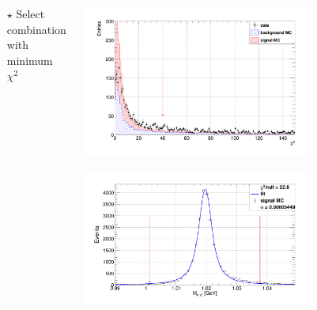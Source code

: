 \documentclass[aspectratio=169]{ctexbeamer}
\begin{document}
\begin{frame}
\begin{columns}
\begin{column}{0.5\textwidth}
\begin{itemize}
        \item[$\star$] Select combination with minimum $\chi^2$
      \end{itemize}
    \end{column}
    \begin{column}{0.5\textwidth}
      \centering
      \includegraphics[width=0.75\textwidth]{figures/chisq_cut.png}
      
      \includegraphics[width=0.75\textwidth]{figures/sMC_phi_fit_0.png}
    \end{column}
  \end{columns}
\end{frame}
\end{document}
